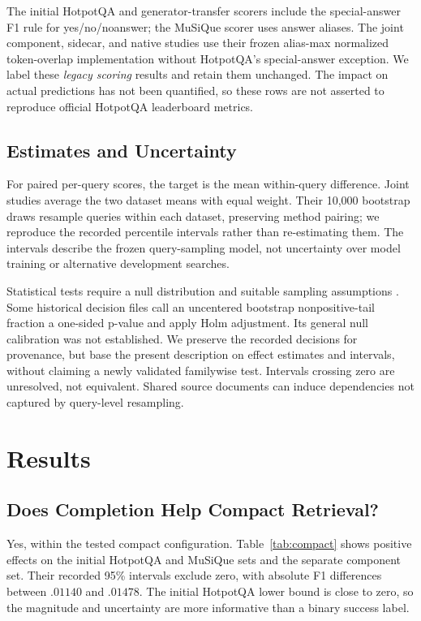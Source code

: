 \documentclass[11pt]{article}
\begin{document}
The initial HotpotQA and generator-transfer scorers include the special-answer
F1 rule for yes/no/noanswer; the MuSiQue scorer uses answer aliases.
The joint component, sidecar, and native studies use their frozen
alias-max normalized token-overlap implementation without HotpotQA's
special-answer exception. We label these \emph{legacy scoring} results and
retain them unchanged. The impact on actual predictions has not been
quantified, so these rows are not asserted to reproduce official HotpotQA
leaderboard metrics.

\subsection{Estimates and Uncertainty}
For paired per-query scores, the target is the mean within-query difference.
Joint studies average the two dataset means with equal weight. Their 10,000
bootstrap draws resample queries within each dataset, preserving method
pairing; we reproduce the recorded percentile intervals rather than
re-estimating them. The intervals describe the frozen query-sampling model,
not uncertainty over model training or alternative development searches.

Statistical tests require a null distribution and suitable sampling assumptions
\citep{dror2018hitchhiker}. Some historical decision files call an uncentered
bootstrap nonpositive-tail fraction a one-sided p-value and apply Holm
adjustment. Its general null calibration was not established. We preserve the
recorded decisions for provenance, but base the present description on effect
estimates and intervals, without claiming a newly validated familywise test.
Intervals crossing zero are unresolved, not equivalent. Shared source
documents can induce dependencies not captured by query-level resampling.

\section{Results}
\subsection{Does Completion Help Compact Retrieval?}
Yes, within the tested compact configuration. Table~\ref{tab:compact} shows
positive effects on the initial HotpotQA and MuSiQue sets and the separate
component set. Their recorded 95\% intervals exclude zero, with absolute
F1 differences between $.01140$ and $.01478$. The initial HotpotQA lower
bound is close to zero, so the magnitude and uncertainty are more informative
than a binary success label.
\end{document}
